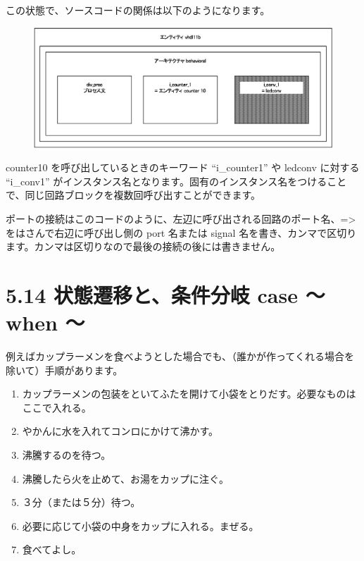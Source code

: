 \documentclass[letterpaper,10pt,dvipdfmx]{sphinxmanual}
\begin{document}
この状態で、ソースコードの関係は以下のようになります。
\begin{figure}[htbp]
\centering

\includegraphics{figure27.eps}
\end{figure}

counter10 を呼び出しているときのキーワード ``i\_counter1'' や ledconv に対する ``i\_conv1'' がインスタンス名となります。固有のインスタンス名をつけることで、同じ回路ブロックを複数回呼び出すことができます。

ポートの接続はこのコードのように、左辺に呼び出される回路のポート名、=\textgreater{} をはさんで右辺に呼び出し側の port 名または signal 名を書き、カンマで区切ります。カンマは区切りなので最後の接続の後には書きません。


\section{5.14 状態遷移と、条件分岐 case ～ when ～}
\label{05_try:case-when}
例えばカップラーメンを食べようとした場合でも、（誰かが作ってくれる場合を除いて）手順があります。
\begin{enumerate}
\item {} 
カップラーメンの包装をといてふたを開けて小袋をとりだす。必要なものはここで入れる。

\item {} 
やかんに水を入れてコンロにかけて沸かす。

\item {} 
沸騰するのを待つ。

\item {} 
沸騰したら火を止めて、お湯をカップに注ぐ。

\item {} 
３分（または５分）待つ。

\item {} 
必要に応じて小袋の中身をカップに入れる。まぜる。

\item {} 
食べてよし。

\end{enumerate}
\end{document}
